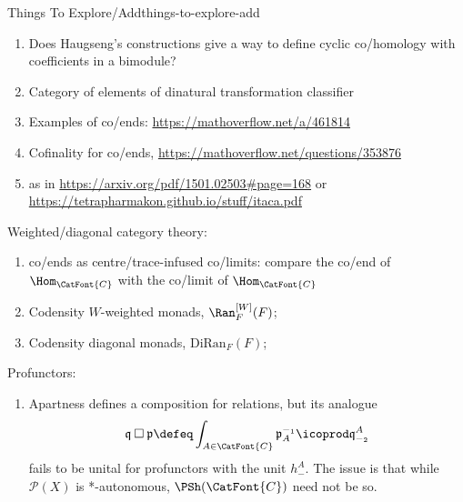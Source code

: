 \begin{remark}{Things To Explore/Add}{things-to-explore-add}
\begin{enumerate}
        \item Does Haugseng's constructions give a way to define cyclic co/homology with coefficients in a bimodule?
        \item Category of elements of dinatural transformation classifier
        \item Examples of co/ends: \url{https://mathoverflow.net/a/461814}
        \item Cofinality for co/ends, \url{https://mathoverflow.net/questions/353876}
        \item {} as in \url{https://arxiv.org/pdf/1501.02503#page=168} or \url{https://tetrapharmakon.github.io/stuff/itaca.pdf}
    \end{enumerate}
    Weighted/diagonal category theory:
    \begin{enumerate}
        \item co/ends as centre/trace-infused co/limits: compare the co/end of $\Hom_{\CatFont{C}}$ with the co/limit of $\Hom_{\CatFont{C}}$
        \item Codensity $W$-weighted monads, $\Ran^{[W]}_{F}(F)$;
        \item Codensity diagonal monads, $\mathrm{DiRan}_{F}(F)$;
    \end{enumerate}
    Profunctors:
    \begin{enumerate}
        \item Apartness defines a composition for relations, but its analogue
            \[
                \mathfrak{q}\mathbin{\square}\mathfrak{p}%
                \defeq%
                \int_{A\in\CatFont{C}}\mathfrak{p}^{-_{1}}_{A}\icoprod\mathfrak{q}^{A}_{-_{2}}%
            \]%
            fails to be unital for profunctors with the unit $h^{A}_{-}$. The issue is that while $\mathcal{P}(X)$ is *-autonomous, $\PSh(\CatFont{C})$ need not be so.


\end{enumerate}
\end{remark}

